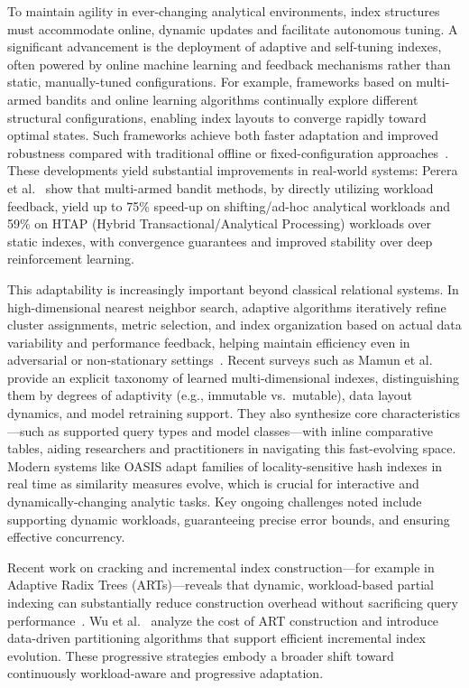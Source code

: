 \documentclass[sigconf]{acmart}
\begin{document}
To maintain agility in ever-changing analytical environments, index structures must accommodate online, dynamic updates and facilitate autonomous tuning. A significant advancement is the deployment of adaptive and self-tuning indexes, often powered by online machine learning and feedback mechanisms rather than static, manually-tuned configurations. For example, frameworks based on multi-armed bandits and online learning algorithms continually explore different structural configurations, enabling index layouts to converge rapidly toward optimal states. Such frameworks achieve both faster adaptation and improved robustness compared with traditional offline or fixed-configuration approaches~\cite{ref79,ref80,ref105}. These developments yield substantial improvements in real-world systems: Perera et al.~\cite{ref105} show that multi-armed bandit methods, by directly utilizing workload feedback, yield up to 75\% speed-up on shifting/ad-hoc analytical workloads and 59\% on HTAP (Hybrid Transactional/Analytical Processing) workloads over static indexes, with convergence guarantees and improved stability over deep reinforcement learning.

This adaptability is increasingly important beyond classical relational systems. In high-dimensional nearest neighbor search, adaptive algorithms iteratively refine cluster assignments, metric selection, and index organization based on actual data variability and performance feedback, helping maintain efficiency even in adversarial or non-stationary settings~\cite{ref110}. Recent surveys such as Mamun et al.~\cite{ref110} provide an explicit taxonomy of learned multi-dimensional indexes, distinguishing them by degrees of adaptivity (e.g., immutable vs.\ mutable), data layout dynamics, and model retraining support. They also synthesize core characteristics---such as supported query types and model classes---with inline comparative tables, aiding researchers and practitioners in navigating this fast-evolving space. Modern systems like OASIS adapt families of locality-sensitive hash indexes in real time as similarity measures evolve, which is crucial for interactive and dynamically-changing analytic tasks. Key ongoing challenges noted include supporting dynamic workloads, guaranteeing precise error bounds, and ensuring effective concurrency.

Recent work on cracking and incremental index construction---for example in Adaptive Radix Trees (ARTs)---reveals that dynamic, workload-based partial indexing can substantially reduce construction overhead without sacrificing query performance~\cite{ref109}. Wu et al.~\cite{ref109} analyze the cost of ART construction and introduce data-driven partitioning algorithms that support efficient incremental index evolution. These progressive strategies embody a broader shift toward continuously workload-aware and progressive adaptation.
\end{document}

